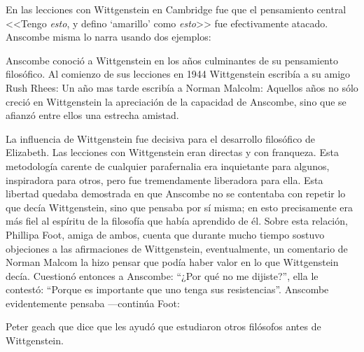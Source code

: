 
En las lecciones con Wittgenstein en Cambridge fue que el pensamiento central <<Tengo \emph{esto}, y defino `amarillo' como \emph{esto}>> fue efectivamente atacado. Anscombe misma lo narra usando dos ejemplos:

Anscombe conoció a Wittgenstein en los años culminantes de su pensamiento filosófico. Al comienzo de sus lecciones en 1944 Wittgenstein escribía a su amigo Rush Rhees:  Un año mas tarde escribía a Norman Malcolm:  Aquellos años no sólo creció en Wittgenstein la apreciación de la capacidad de Anscombe, sino que se afianzó entre ellos una estrecha amistad.

La influencia de Wittgenstein fue decisiva para el desarrollo filosófico de Elizabeth. Las lecciones con Wittgenstein eran directas y con franqueza. Esta metodología carente de cualquier parafernalia era inquietante para algunos, inspiradora para otros, pero fue tremendamente liberadora para ella.\autocite[loc 9853 Chapter 4, Section 24, \S5]{monk} Esta libertad quedaba demostrada en que Anscombe no se contentaba con repetir lo que decía Wittgenstein, sino que pensaba por sí misma; en esto precisamente era más fiel al espíritu de la filosofía que había aprendido de él. Sobre esta relación, Phillipa Foot, amiga de ambos, cuenta que durante mucho tiempo sostuvo objeciones a las afirmaciones de Wittgenstein, eventualmente, un comentario de Norman Malcom la hizo pensar que podía haber valor en lo que Wittgenstein decía. Cuestionó entonces a Anscombe: ``¿Por qué no me dijiste?'', ella le contestó: ``Porque es importante que uno tenga sus resistencias''. Anscombe evidentemente pensaba ---continúa Foot: 

Peter geach que dice que les ayudó que estudiaron otros filósofos antes de Wittgenstein.

